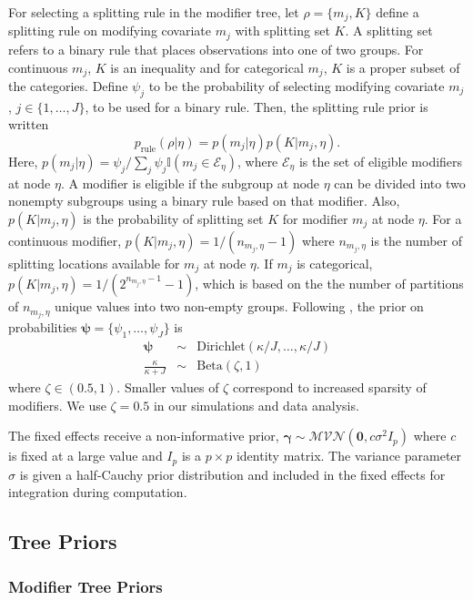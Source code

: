 \documentclass[12pt]{article}
\begin{document}
For selecting a splitting rule in the modifier tree, let $\rho=\{m_j,K\}$ define a splitting rule on modifying covariate $m_j$ with splitting set $K$. A splitting set refers to a binary rule that places observations into one of two groups. For continuous $m_j$, $K$ is an inequality and for categorical $m_j$, $K$ is a proper subset of the categories. Define $\psi_j$ to be the probability of selecting modifying covariate $m_j$, $j\in\{1,\ldots,J\}$, to be used for a binary rule. Then, the splitting rule prior is written
\begin{equation}
    p_{\text{rule}}(\rho|\eta)=p(m_j|\eta)p(K|m_j,\eta).
\end{equation}
Here, $p(m_j|\eta)=\psi_j/\sum_j\psi_j\mathbb{I}(m_j\in\mathcal{E}_\eta)$, where $\mathcal{E}_\eta$ is the set of eligible modifiers at node $\eta$. A modifier is eligible if the subgroup at node $\eta$ can be divided into two nonempty subgroups using a binary rule based on that modifier. Also, $p(K|m_j,\eta)$ is the probability of splitting set $K$ for modifier $m_j$ at node $\eta$. For a continuous modifier, $p(K|m_j,\eta)=1\big/(n_{m_j,\eta}-1)$ where $n_{m_j,\eta}$ is the number of splitting locations available for $m_j$ at node $\eta$. If $m_j$ is categorical, $p(K|m_j,\eta)=1\big/(2^{n_{m_j,\eta}-1}-1)$, which is based on the the number of partitions of $n_{m_j,\eta}$ unique values into two non-empty groups. Following \cite{Linero2018}, the prior on probabilities $\boldsymbol\psi=\{\psi_1,\ldots,\psi_J\}$ is
\begin{eqnarray}
    \boldsymbol\psi&\sim&\text{Dirichlet}(\kappa/J,\ldots,\kappa/J)\\
    \frac{\kappa}{\kappa+J}&\sim&\text{Beta}(\zeta,1)
\end{eqnarray}
where $\zeta\in(0.5,1)$. Smaller values of $\zeta$ correspond to increased sparsity of modifiers. We use $\zeta=0.5$ in our simulations and data analysis.

The fixed effects receive a non-informative prior, $\boldsymbol\gamma\sim\mathcal{MVN}(\mathbf{0},c\sigma^2I_p)$ where $c$ is fixed at a large value and $I_p$ is a $p\times p$ identity matrix. The variance parameter $\sigma$ is given a half-Cauchy prior distribution and included in the fixed effects for integration during computation.

\subsection{Tree Priors}
\subsubsection{Modifier Tree Priors}
\end{document}
